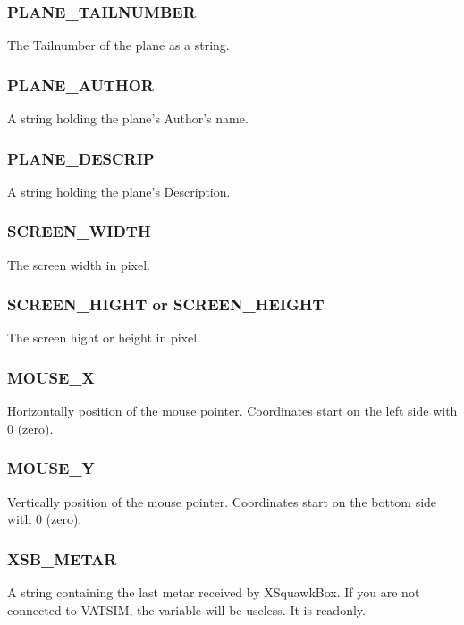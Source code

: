 \documentclass[11pt,parskip=half,a4paper]{scrartcl}
\begin{document}
\subsubsection{PLANE\_TAILNUMBER}

The Tailnumber of the plane as a string.

\subsubsection{PLANE\_AUTHOR}

A string holding the plane's Author's name.

\subsubsection{PLANE\_DESCRIP}

A string holding the plane's Description.

\subsubsection{SCREEN\_WIDTH}

The screen width in pixel.

\subsubsection{SCREEN\_HIGHT or SCREEN\_HEIGHT}

The screen hight or height in pixel.

\subsubsection{MOUSE\_X}

Horizontally position of the mouse pointer. Coordinates start on the left side with 0 (zero).

\subsubsection{MOUSE\_Y}

Vertically position of the mouse pointer. Coordinates start on the bottom side with 0 (zero).

\subsubsection{XSB\_METAR}

A string containing the last metar received by XSquawkBox. If you are not connected to VATSIM, the variable will be useless. It is readonly.
\end{document}
